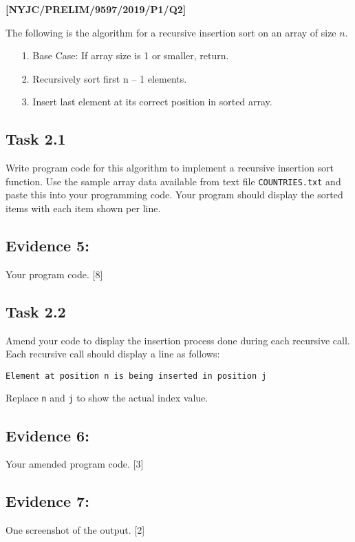 \item \textbf{{[}NYJC/PRELIM/9597/2019/P1/Q2{]} }

The following is the algorithm for a recursive insertion sort on an
array of size $n$. 
\begin{enumerate}
\item[1.]  Base Case: If array size is 1 or smaller, return. 
\item[2.]  Recursively sort first n -- 1 elements. 
\item[3.]  Insert last element at its correct position in sorted array. 
\end{enumerate}

\subsection*{Task 2.1 }

Write program code for this algorithm to implement a recursive insertion
sort function. Use the sample array data available from text file
\texttt{COUNTRIES.txt} and paste this into your programming code.
Your program should display the sorted items with each item shown
per line. 

\subsection*{Evidence 5: }

Your program code. \hfill{}{[}8{]}

\subsection*{Task 2.2 }

Amend your code to display the insertion process done during each
recursive call. Each recursive call should display a line as follows: 

\texttt{Element at position n is being inserted in position j }

Replace \texttt{n} and \texttt{j} to show the actual index value. 

\subsection*{Evidence 6: }

Your amended program code. \hfill{}{[}3{]}

\subsection*{Evidence 7:}

One screenshot of the output. \hfill{} {[}2{]}